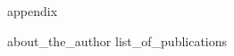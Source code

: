 
\ifdraft
\else
    {appendix}
    \printglossary[type=\acronymtype,nonumberlist]
\fi


% 
% 

% 
\renewcommand{\bibname}{Bibliography}


\ifdraft
   
\else
    {about_the_author}
    {list_of_publications}
\fi

\ifprintcover
    \cleardoublepage
    \thispagestyle{empty}
    
\fi